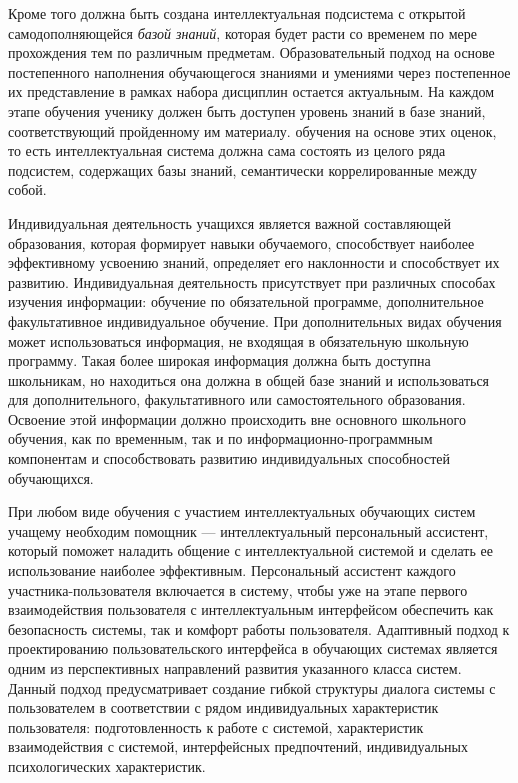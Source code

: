 Кроме того должна быть создана интеллектуальная подсистема с открытой самодополняющейся \textit{базой знаний}, которая будет расти со временем по мере прохождения тем по различным предметам. Образовательный подход на основе постепенного наполнения обучающегося знаниями и умениями через постепенное их представление в рамках набора дисциплин остается актуальным. На каждом этапе обучения ученику должен быть доступен уровень знаний в базе знаний, соответствующий пройденному им материалу. обучения на основе этих оценок, то есть интеллектуальная система должна сама состоять из целого ряда подсистем, содержащих базы знаний, семантически коррелированные между собой.

Индивидуальная деятельность учащихся является важной составляющей образования, которая формирует навыки обучаемого, способствует наиболее эффективному усвоению знаний, определяет его наклонности и способствует их развитию. Индивидуальная деятельность присутствует при различных способах изучения информации: обучение по обязательной программе, дополнительное факультативное индивидуальное обучение. При дополнительных видах обучения может использоваться информация, не входящая в обязательную школьную программу. Такая более широкая информация должна быть доступна школьникам, но находиться она должна в общей базе знаний и использоваться для дополнительного, факультативного или самостоятельного образования. Освоение этой информации должно происходить вне основного школьного обучения, как по временным, так и по информационно-программным компонентам и способствовать развитию индивидуальных способностей обучающихся.

При любом виде обучения  с участием интеллектуальных обучающих систем учащему необходим помощник --- интеллектуальный персональный ассистент, который  поможет наладить общение с интеллектуальной системой и сделать ее использование наиболее эффективным. Персональный ассистент каждого участника-пользователя включается в систему, чтобы уже на этапе первого взаимодействия пользователя с интеллектуальным интерфейсом обеспечить как безопасность системы, так и комфорт работы пользователя. Адаптивный подход к проектированию пользовательского интерфейса в обучающих системах является одним из перспективных направлений развития указанного класса систем. Данный подход предусматривает создание гибкой структуры диалога системы с пользователем в соответствии с рядом индивидуальных характеристик пользователя: подготовленность к работе с системой, характеристик взаимодействия с системой, интерфейсных предпочтений, индивидуальных психологических характеристик.

